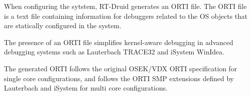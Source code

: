 When configuring the sytstem, R\+T-\/\+Druid generates an O\+R\+TI file. The O\+R\+TI file is a text file containing information for debuggers related to the OS objects that are statically configured in the system.

The presence of an O\+R\+TI file simplifies kernel-\/aware debugging in advanced debugging systems such as Lauterbach T\+R\+A\+C\+E32 and i\+System Win\+Idea.

The generated O\+R\+TI follows the original O\+S\+E\+K/\+V\+DX O\+R\+TI specification for single core configurations, and follows the O\+R\+TI S\+MP extensions defined by Lauterbach and i\+System for multi core configurations. 